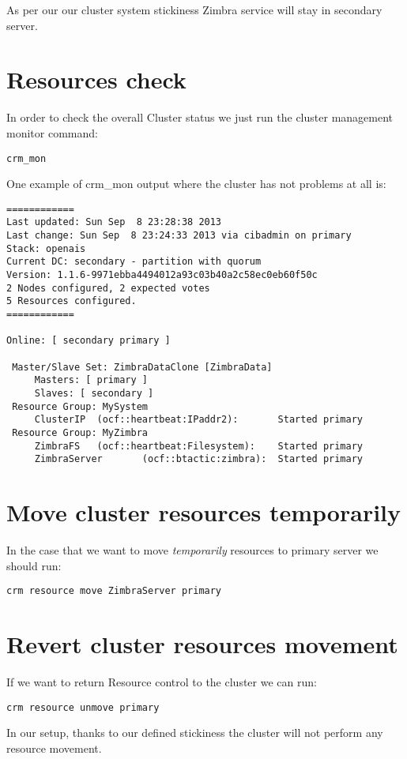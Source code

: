 As per our our cluster system stickiness Zimbra service will stay in secondary server.

\section {Resources check}
In order to check the overall Cluster status we just run the cluster management monitor command:
\begin{verbatim}
crm_mon
\end{verbatim}

One example of crm\_mon output where the cluster has not problems at all is:
\begin{verbatim}
============
Last updated: Sun Sep  8 23:28:38 2013
Last change: Sun Sep  8 23:24:33 2013 via cibadmin on primary
Stack: openais
Current DC: secondary - partition with quorum
Version: 1.1.6-9971ebba4494012a93c03b40a2c58ec0eb60f50c
2 Nodes configured, 2 expected votes
5 Resources configured.
============

Online: [ secondary primary ]

 Master/Slave Set: ZimbraDataClone [ZimbraData]
     Masters: [ primary ]
     Slaves: [ secondary ]
 Resource Group: MySystem
     ClusterIP  (ocf::heartbeat:IPaddr2):       Started primary
 Resource Group: MyZimbra
     ZimbraFS   (ocf::heartbeat:Filesystem):    Started primary
     ZimbraServer       (ocf::btactic:zimbra):  Started primary
\end{verbatim}

\section {Move cluster resources temporarily}
In the case that we want to move \textit{temporarily} resources to primary server we should run:
\begin{verbatim}
crm resource move ZimbraServer primary
\end{verbatim}

\section {Revert cluster resources movement}
If we want to return Resource control to the cluster we can run:
\begin{verbatim}
crm resource unmove primary
\end{verbatim}
In our setup, thanks to our defined stickiness the cluster will not perform any resource movement.

